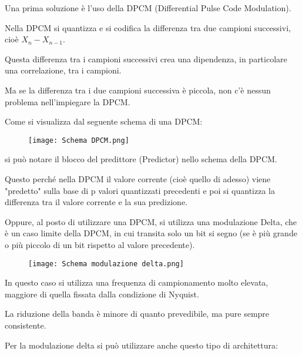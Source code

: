 Una prima soluzione è l'uso della DPCM (Differential Pulse Code Modulation). \newline 

Nella DPCM si quantizza e si codifica la differenza tra due campioni successivi, cioè $X_n - X_{n-1}$. \newline 

Questa differenza tra i campioni successivi crea una dipendenza, in particolare una correlazione, tra i campioni. \newline 

Ma se la differenza tra i due campioni successiva è piccola, non c'è nessun problema nell'impiegare la DPCM. \newline 

Come si visualizza dal seguente schema di una DPCM: 

\begin{figure}[h]
    \centering
    \texttt{[image: Schema DPCM.png]}
\end{figure} 

si può notare il blocco del predittore (Predictor) nello schema della DPCM. \newline 

Questo perché nella DPCM il valore corrente (cioè quello di adesso) viene "predetto" sulla base di p valori quantizzati precedenti e poi si quantizza la differenza tra il valore corrente e la sua predizione. \newline 


Oppure, al posto di utilizzare una DPCM, si utilizza una modulazione Delta, 
che è un caso limite della DPCM, in cui transita solo un bit si segno (se è più grande o più piccolo di un bit rispetto al valore precedente). \newline 

\begin{figure}[h]
    \centering
    \texttt{[image: Schema modulazione delta.png]}
\end{figure} 

In questo caso si utilizza una frequenza di campionamento molto elevata, 
maggiore di quella fissata dalla condizione di Nyquist. \newline 

La riduzione della banda è minore di quanto prevedibile, ma pure sempre consistente. \newline 

\newpage

Per la modulazione delta si può utilizzare anche questo tipo di architettura: 

